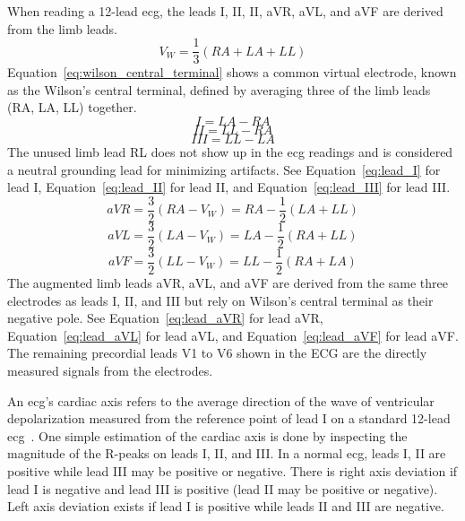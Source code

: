 \documentclass[\main/thesis.tex]{subfiles}
\begin{document}
When reading a 12-lead \gls{ecg}, the leads I, II, II, aVR, aVL, and aVF are derived from the limb leads.
\begin{equation}
    V_W = \dfrac{1}{3}(RA + LA + LL) \label{eq:wilson_central_terminal}
\end{equation}
Equation~\ref{eq:wilson_central_terminal} shows a common virtual electrode, known as the Wilson's central terminal, defined by averaging three of the limb leads (RA, LA, LL) together.
\begin{equation}
    I = LA - RA \label{eq:lead_I}
\end{equation}
\begin{equation}
    II = LL - RA \label{eq:lead_II}
\end{equation}
\begin{equation}
    III = LL - LA \label{eq:lead_III}
\end{equation}
The unused limb lead RL does not show up in the \gls{ecg} readings and is considered a neutral grounding lead for minimizing artifacts.
See Equation~\ref{eq:lead_I} for lead I, Equation~\ref{eq:lead_II} for lead II, and Equation~\ref{eq:lead_III} for lead III.
\begin{equation}
    aVR = \dfrac{3}{2}(RA - V_W) = RA - \dfrac{1}{2}(LA + LL) \label{eq:lead_aVR}
\end{equation}
\begin{equation}
    aVL = \dfrac{3}{2}(LA - V_W) = LA - \dfrac{1}{2}(RA + LL) \label{eq:lead_aVL}
\end{equation}
\begin{equation}
    aVF = \dfrac{3}{2}(LL - V_W) = LL - \dfrac{1}{2}(RA + LA) \label{eq:lead_aVF}
\end{equation}
The augmented limb leads aVR, aVL, and aVF are derived from the same three electrodes as leads I, II, and III but rely on Wilson's central terminal as their negative pole.
See Equation~\ref{eq:lead_aVR} for lead aVR, Equation~\ref{eq:lead_aVL} for lead aVL, and Equation~\ref{eq:lead_aVF} for lead aVF.
The remaining precordial leads V1 to V6 shown in the ECG are the directly measured signals from the electrodes.

An \gls{ecg}'s cardiac axis refers to the average direction of the wave of ventricular depolarization measured from the reference point of lead I on a standard 12-lead \gls{ecg}~\cite{meek_introduction_2002}.
One simple estimation of the cardiac axis is done by inspecting the magnitude of the R-peaks on leads I, II, and III.
In a normal \gls{ecg}, leads I, II are positive while lead III may be positive or negative.
There is right axis deviation if lead I is negative and lead III is positive (lead II may be positive or negative).
Left axis deviation exists if lead I is positive while leads II and III are negative.
\end{document}
